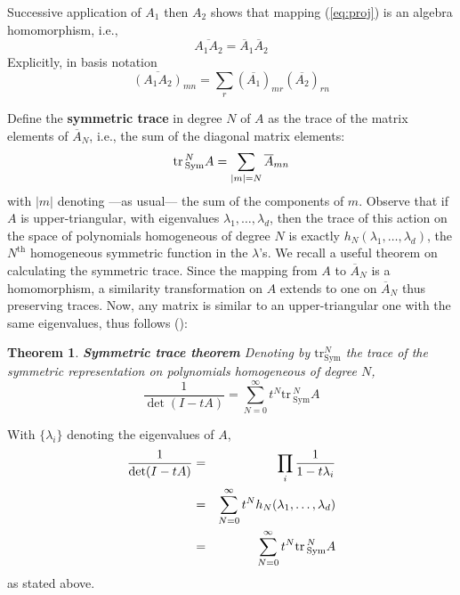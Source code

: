 \documentclass[12pt]{article}    %
\newtheorem{thm}{Theorem}[section]       %
\def\qed{\qquad\framebox[7pt]\medskip\noindent}
\def\tr{\mathrm{tr}\,}
\newenvironment{proof}{{\sl Proof:}\quad}{\hfill{\qed}\\ \noindent}
\begin{document}
Successive application of $A_1$ then $A_2$ shows that mapping 
(\ref{eq:proj}) is an algebra homomorphism, i.e., 
$$
\overline{A_1A_2}=\overline{A}_1\overline{A}_2
$$
Explicitly, in basis notation
$$ 
\overline{(A_1A_2)}_{mn}=
          \sum_r (\overline{A_1})_{mr}
                 (\overline{A_2})_{rn}
$$ 

Define the {\bf symmetric trace} in degree $N$ of $A$ as the trace of
the matrix elements of $\overline{A}_N$, i.e., the sum of the diagonal
matrix elements:
$$
     \tr_{\rm Sym}^N A=\sum_{|m|=N}\overline{A}_{mn}
$$
with $|m|$ denoting ---as usual--- the sum of the components of $m$.
Observe that if $A$ is upper-triangular, 
with eigenvalues $\lambda_1,\ldots,\lambda_d$, then the trace of
this action on the space of polynomials homogeneous of degree $N$ is 
exactly  $h_N(\lambda_1,\ldots,\lambda_d)$, the $N^{\mathrm{th}}$ 
homogeneous symmetric function in the $\lambda$'s. 
We recall a useful theorem on calculating the symmetric trace.
Since the mapping from $A$ to $\overline{A}_N$ is a homomorphism, a
similarity transformation on $A$ extends to one on $\overline{A}_N$ thus
preserving traces. Now, any matrix is similar to an upper-triangular 
one with the same eigenvalues, thus follows (\cite{Spr}):

\begin{thm}{\bf Symmetric trace theorem}
\label{thm:symmtr}
Denoting by $\mathrm{tr}_{\mathrm{Sym}}^N$ the trace of the symmetric
representation on polynomials homogeneous of degree $N$, 
$$
     \frac{1}{\det(I-tA)}=\sum_{N=0}^\infty t^N\tr_{\mathrm{Sym}}^N A
$$
\end{thm}

\begin{proof} 
With $\{\lambda_i\}$ denoting the eigenvalues of $A$,
\begin{eqnarray*}
\frac{1}{\det(I-tA)} 
           &=&\prod_i\frac{1}{1-t\lambda_i}\cr
           &=&\sum_{N=0}^\infty t^Nh_N(\lambda_1,\ldots,\lambda_d)\cr
           &=&\sum_{N=0}^\infty t^N\tr_{\mathrm{Sym}}^N A\cr
\end{eqnarray*}
as stated above.
\end{proof}

\end{document}
